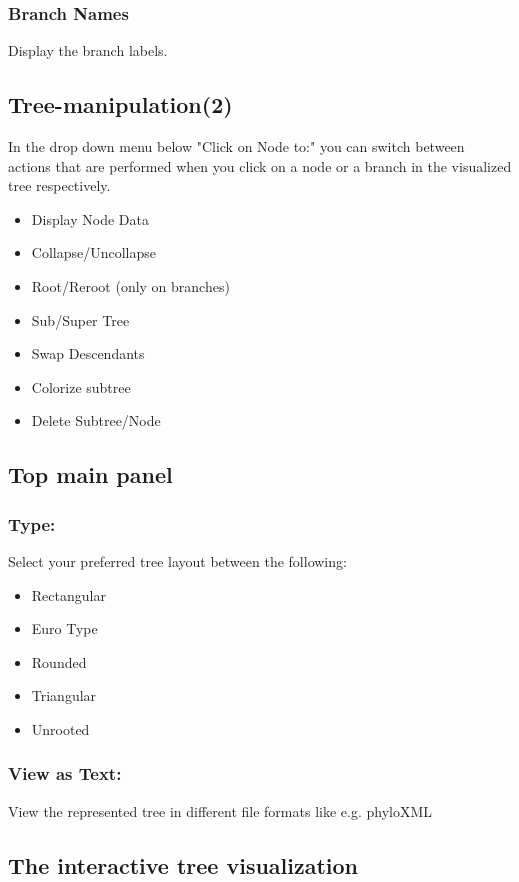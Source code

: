 \documentclass{article}
\begin{document}
        \subsubsection*{Branch Names} Display the branch labels.
 	 \subsection{Tree-manipulation(2)}
        In the drop down menu below "Click on Node to:" you can switch between actions that are performed when you click on a node or a branch in the visualized tree respectively.
          \begin{itemize}
              \item Display Node Data
              \item Collapse/Uncollapse
              \item Root/Reroot (only on branches)
              \item Sub/Super Tree
              \item Swap Descendants
              \item Colorize subtree
              \item Delete Subtree/Node
           \end{itemize}
       \subsection{Top main panel}
          \subsubsection*{Type:}
          Select your preferred tree layout between the following:
          \begin{itemize}
              \item Rectangular
              \item Euro Type
              \item Rounded
              \item Triangular
              \item Unrooted
          \end{itemize}   
          \subsubsection*{View as Text:}
          View the represented tree in different file formats like e.g. phyloXML
       
       \subsection{The interactive tree visualization}
\end{document}

